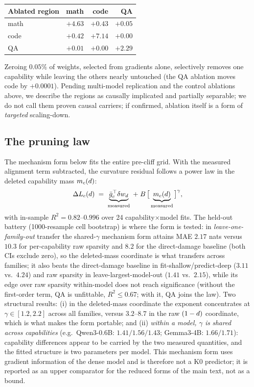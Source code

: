 \begin{center}
\small
\begin{tabular}{@{}lrrr@{}}
\toprule
Ablated region & math & code & QA \\
\midrule
math & $\mathbf{+4.63}$ & $+0.43$ & $+0.05$ \\
code & $+0.42$ & $\mathbf{+7.14}$ & $+0.00$ \\
QA   & $+0.01$ & $+0.00$ & $\mathbf{+2.29}$ \\
\bottomrule
\end{tabular}
\end{center}

Zeroing $0.05\%$ of weights, selected from gradients alone, selectively
removes one capability while leaving the others nearly untouched
(the QA ablation moves code by $+0.0001$). Pending multi-model
replication and the control ablations above, we describe the regions as
causally implicated and partially separable; we do not call them proven
causal carriers; if confirmed, ablation itself is a form of
\emph{targeted} scaling-down.

\FloatBarrier
\subsection{The pruning law}
\label{sec:law}

The mechanism form below fits the entire pre-cliff grid.
With the measured alignment term subtracted, the curvature residual
follows a power law in the deleted capability mass $m_c(d)$:
\begin{equation}
\Delta L_{c}(d)\;=\;\underbrace{\bar{g}_{c}^{\top}\delta w_d}_{\text{measured}}
\;+\;B\,\big[\underbrace{m_c(d)}_{\text{measured}}\big]^{\gamma},
\label{eq:fitlaw}
\end{equation}
with in-sample $R^2 = 0.82$--$0.996$ over 24 capability$\times$model
fits. The held-out battery (1000-resample cell bootstrap) is where the
form is tested: in \emph{leave-one-family-out} transfer the
shared-$\gamma$ mechanism form attains MAE $2.17$ nats versus $10.3$
for per-capability raw sparsity and $8.2$ for the direct-damage
baseline (both CIs exclude zero), so the deleted-mass coordinate is what
transfers across families; it also beats the direct-damage baseline in
fit-shallow/predict-deep ($3.11$ vs.\ $4.24$) and raw sparsity in
leave-largest-model-out ($1.41$ vs.\ $2.15$), while its edge over raw
sparsity within-model does not reach significance
(without the first-order term, QA is unfittable, $R^2\!\le\!0.67$;
with it, QA joins the law). Two structural results:
(i) in the deleted-mass coordinate the exponent concentrates at
$\gamma\in[1.2,2.2]$ across all families, versus $3.2$--$8.7$ in the
raw $(1-d)$ coordinate, which is what makes
the form portable; and (ii) \emph{within a model, $\gamma$ is shared
across capabilities} (e.g.\ Qwen3-0.6B: $1.41/1.56/1.43$;
Gemma3-4B: $1.66/1.71$): capability differences appear to be carried
by the two measured quantities, and the fitted structure is two
parameters per model. This mechanism form uses gradient
information of the dense model and is therefore not a K0 predictor; it
is reported as an upper comparator for the reduced forms of the main
text, not as a bound.

